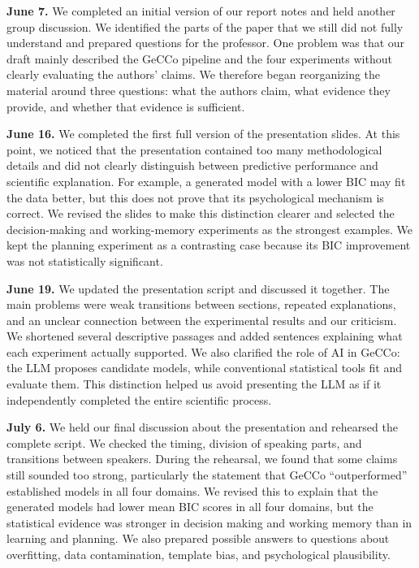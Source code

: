 \textbf{June 7.} We completed an initial version of our report notes and held another group discussion. We identified the parts of the paper that we still did not fully understand and prepared questions for the professor. One problem was that our draft mainly described the GeCCo pipeline and the four experiments without clearly evaluating the authors' claims. We therefore began reorganizing the material around three questions: what the authors claim, what evidence they provide, and whether that evidence is sufficient.
 
\textbf{June 16.} We completed the first full version of the presentation slides. At this point, we noticed that the presentation contained too many methodological details and did not clearly distinguish between predictive performance and scientific explanation. For example, a generated model with a lower BIC may fit the data better, but this does not prove that its psychological mechanism is correct. We revised the slides to make this distinction clearer and selected the decision-making and working-memory experiments as the strongest examples. We kept the planning experiment as a contrasting case because its BIC improvement was not statistically significant.
 
\textbf{June 19.} We updated the presentation script and discussed it together. The main problems were weak transitions between sections, repeated explanations, and an unclear connection between the experimental results and our criticism. We shortened several descriptive passages and added sentences explaining what each experiment actually supported. We also clarified the role of AI in GeCCo: the LLM proposes candidate models, while conventional statistical tools fit and evaluate them. This distinction helped us avoid presenting the LLM as if it independently completed the entire scientific process.
 
\textbf{July 6.} We held our final discussion about the presentation and rehearsed the complete script. We checked the timing, division of speaking parts, and transitions between speakers. During the rehearsal, we found that some claims still sounded too strong, particularly the statement that GeCCo ``outperformed'' established models in all four domains. We revised this to explain that the generated models had lower mean BIC scores in all four domains, but the statistical evidence was stronger in decision making and working memory than in learning and planning. We also prepared possible answers to questions about overfitting, data contamination, template bias, and psychological plausibility.
 

